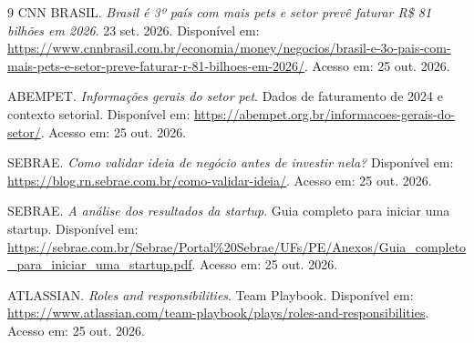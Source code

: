 \documentclass[12pt,a4paper]{article}
\begin{document}
\begin{thebibliography}{9}
CNN BRASIL. \textit{Brasil é 3º país com mais pets e setor prevê faturar R\$ 81 bilhões em 2026}. 23 set. 2026.
Disponível em: \url{https://www.cnnbrasil.com.br/economia/money/negocios/brasil-e-3o-pais-com-mais-pets-e-setor-preve-faturar-r-81-bilhoes-em-2026/}. Acesso em: 25 out. 2026.

ABEMPET. \textit{Informações gerais do setor pet}. Dados de faturamento de 2024 e contexto setorial.
Disponível em: \url{https://abempet.org.br/informacoes-gerais-do-setor/}. Acesso em: 25 out. 2026.

SEBRAE. \textit{Como validar ideia de negócio antes de investir nela?}
Disponível em: \url{https://blog.rn.sebrae.com.br/como-validar-ideia/}. Acesso em: 25 out. 2026.

SEBRAE. \textit{A análise dos resultados da startup}. Guia completo para iniciar uma startup.
Disponível em: \url{https://sebrae.com.br/Sebrae/Portal\%20Sebrae/UFs/PE/Anexos/Guia\_completo\_para\_iniciar\_uma\_startup.pdf}. Acesso em: 25 out. 2026.

ATLASSIAN. \textit{Roles and responsibilities}. Team Playbook.
Disponível em: \url{https://www.atlassian.com/team-playbook/plays/roles-and-responsibilities}. Acesso em: 25 out. 2026.
\end{thebibliography}
\end{document}
